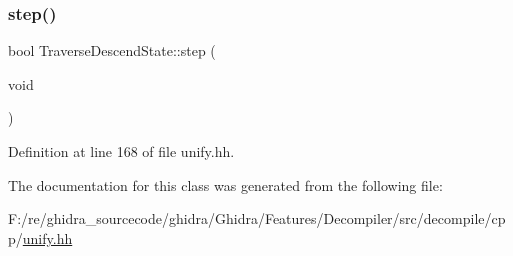 \subsubsection{\texorpdfstring{step()}{step()}}
{\footnotesize\ttfamily bool Traverse\+Descend\+State\+::step (\begin{DoxyParamCaption}\item[{void}]{ }\end{DoxyParamCaption})\hspace{0.3cm}{\ttfamily [inline]}}



Definition at line 168 of file unify.\+hh.



The documentation for this class was generated from the following file\+:\begin{DoxyCompactItemize}
\item 
F\+:/re/ghidra\+\_\+sourcecode/ghidra/\+Ghidra/\+Features/\+Decompiler/src/decompile/cpp/\mbox{\hyperlink{unify_8hh}{unify.\+hh}}\end{DoxyCompactItemize}
